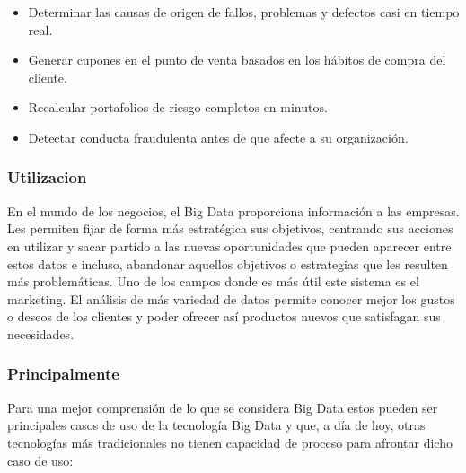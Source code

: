 \begin{itemize}
\item Determinar las causas de origen de fallos, problemas y defectos casi en tiempo real.
\item Generar cupones en el punto de venta basados en los hábitos de compra del cliente.
\item Recalcular portafolios de riesgo completos en minutos.
\item Detectar conducta fraudulenta antes de que afecte a su organización.
\end{itemize}

    
\subsubsection{Utilizacion}
En el mundo de los negocios, el Big Data proporciona información a las empresas. Les permiten fijar de forma más estratégica sus objetivos, centrando sus acciones en utilizar y sacar partido a las nuevas oportunidades que pueden aparecer entre estos datos e incluso, abandonar aquellos objetivos o estrategias que les resulten más problemáticas. Uno de los campos donde es más útil este sistema es el marketing. El análisis de más variedad de datos permite conocer mejor los gustos o deseos de los clientes y poder ofrecer así productos nuevos que satisfagan sus necesidades.

\subsubsection*{Principalmente}
Para una mejor comprensión de lo que se considera Big Data estos pueden ser principales casos de uso de la tecnología Big Data y que, a día de hoy, otras tecnologías más tradicionales no tienen capacidad de proceso para afrontar dicho caso de uso:

